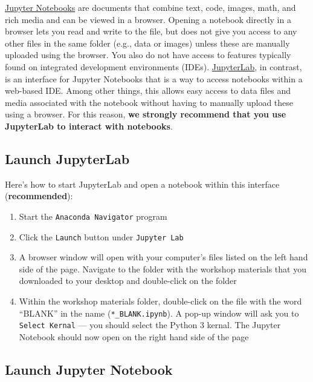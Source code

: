 \documentclass[]{book}
\providecommand{\tightlist}{%
  \setlength{\itemsep}{0pt}\setlength{\parskip}{0pt}}
\begin{document}
\href{https://jupyter-notebook.readthedocs.io/en/stable/}{Jupyter
Notebooks} are documents that combine text, code, images, math, and rich
media and can be viewed in a browser. Opening a notebook directly in a
browser lets you read and write to the file, but does not give you
access to any other files in the same folder (e.g., data or images)
unless these are manually uploaded using the browser. You also do not
have access to features typically found on integrated development
environments (IDEs).
\href{https://jupyterlab.readthedocs.io/en/stable/}{JupyterLab}, in
contrast, is an interface for Jupyter Notebooks that is a way to access
notebooks within a web-based IDE. Among other things, this allows easy
access to data files and media associated with the notebook without
having to manually upload these using a browser. For this reason,
\textbf{we strongly recommend that you use JupyterLab to interact with
notebooks}.

\subsection{Launch JupyterLab}\label{launch-jupyterlab}

Here's how to start JupyterLab and open a notebook within this interface
(\textbf{recommended}):

\begin{enumerate}
\def\labelenumi{\arabic{enumi}.}
\tightlist
\item
  Start the \texttt{Anaconda\ Navigator} program
\item
  Click the \texttt{Launch} button under \texttt{Jupyter\ Lab}
\item
  A browser window will open with your computer's files listed on the
  left hand side of the page. Navigate to the folder with the workshop
  materials that you downloaded to your desktop and double-click on the
  folder
\item
  Within the workshop materials folder, double-click on the file with
  the word ``BLANK'' in the name (\texttt{*\_BLANK.ipynb}). A pop-up
  window will ask you to \texttt{Select\ Kernal} --- you should select
  the Python 3 kernal. The Jupyter Notebook should now open on the right
  hand side of the page
\end{enumerate}

\subsection{Launch Jupyter Notebook}\label{launch-jupyter-notebook}
\end{document}
